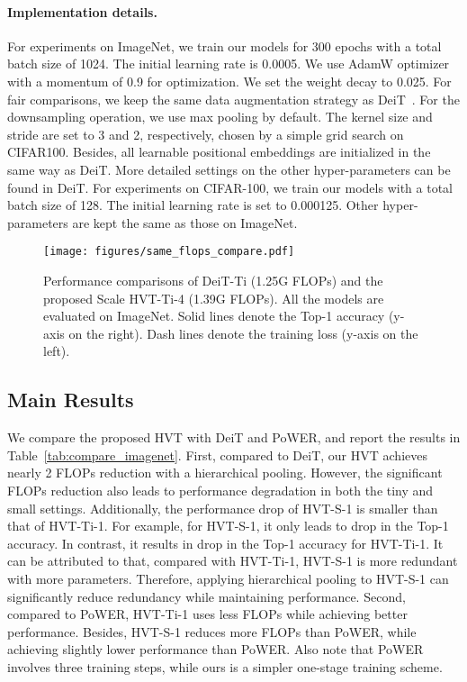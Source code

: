 \paragraph{Implementation details.} 
For experiments on ImageNet, we train our models for 300 epochs with a total batch size of 1024. The initial learning rate is 0.0005. We use AdamW optimizer \cite{loshchilov2019decoupled} with a momentum of 0.9 for optimization. We set the weight decay to 0.025. For fair comparisons, we keep the same data augmentation strategy as DeiT~\cite{deit}. For the downsampling operation, we use max pooling by default. The kernel size  and stride  are set to 3 and 2, respectively, chosen by a simple grid search on CIFAR100. Besides, all learnable positional embeddings are initialized in the same way as DeiT. 
More detailed settings on the other hyper-parameters can be found in DeiT. For experiments on CIFAR-100, we train our models with a total batch size of 128. The initial learning rate is set to 0.000125. Other hyper-parameters are kept the same as those on ImageNet.
\begin{figure}[!tp]
	\centering
	\texttt{[image: figures/same\_flops\_compare.pdf]}
	\vspace{-5pt}
	\caption{Performance comparisons of DeiT-Ti (1.25G FLOPs) and the proposed Scale HVT-Ti-4 (1.39G FLOPs). All the models are evaluated on ImageNet.
	Solid lines denote the Top-1 accuracy (y-axis on the right). Dash lines denote the training loss (y-axis on the left). 
	}
	\label{fig:same_flops_compare}
	\vspace{-18pt}
\end{figure}
\subsection{Main Results} 
We compare the proposed HVT with DeiT and PoWER, and report the results in Table~\ref{tab:compare_imagenet}. First, compared to DeiT, our HVT achieves nearly 2 FLOPs reduction with a hierarchical pooling.
However, the significant FLOPs reduction also leads to performance degradation in both the tiny and small settings. Additionally, the performance drop of HVT-S-1 is smaller than that of HVT-Ti-1. For example, for HVT-S-1, it only leads to  drop in the Top-1 accuracy. In contrast, it results in  drop in the Top-1 accuracy for HVT-Ti-1. It can be attributed to that, compared with HVT-Ti-1, HVT-S-1 is more redundant with more parameters. Therefore, applying hierarchical pooling to HVT-S-1 can significantly reduce redundancy while maintaining performance. Second, compared to PoWER, HVT-Ti-1 uses less FLOPs while achieving better performance. Besides, HVT-S-1 reduces more FLOPs than PoWER, while achieving slightly lower performance than PoWER. Also note that PoWER involves three training steps, while ours is a simpler one-stage training scheme.

